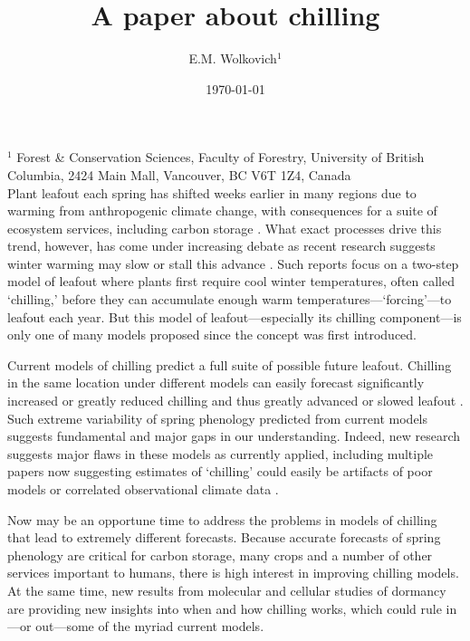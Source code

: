 \documentclass[11pt]{article}
\begin{document}
\renewcommand{\refname}{\CHead{}}


\title{A paper about chilling}
\author{E.M. Wolkovich$^1$} %
\date{\today}
\maketitle

$^1$ Forest \& Conservation Sciences, Faculty of Forestry, University of British Columbia, 2424 Main Mall, Vancouver, BC V6T 1Z4, Canada\\


Plant leafout each spring has shifted weeks earlier in many regions due to warming from anthropogenic climate change, with consequences for a suite of ecosystem services, including carbon storage \citep{keenan2014net,ipcc2022}.  What exact processes drive this trend, however, has come under increasing debate as recent research suggests winter warming may slow or stall this advance \citep{fu2015,piao2017}. Such reports focus on a two-step model of leafout where plants first require cool winter temperatures, often called `chilling,' before they can accumulate enough warm temperatures---`forcing'---to leafout each year. But this model of leafout---especially its chilling component---is only one of many models proposed \citep[at least 20 exist, see][]{hufkens2018integrated} since the concept was first introduced. 

Current models of chilling predict a full suite of possible future leafout. Chilling in the same location under different models can easily forecast significantly increased or greatly reduced chilling and thus greatly advanced or slowed leafout \citep{guy2014,chuine2016}. Such extreme variability of spring phenology predicted from current models suggests fundamental and major gaps in our understanding. Indeed, new research suggests major flaws in these models as currently applied, including multiple papers now suggesting estimates of `chilling' could easily be artifacts of poor models or correlated observational climate data \citep{decsens,gao2024}. 

Now may be an opportune time to address the problems in models of chilling that lead to extremely different forecasts. Because accurate forecasts of spring phenology are critical for carbon storage, many crops and a number of other services important to humans, there is high interest in improving chilling models. At the same time, new results from molecular and cellular studies of dormancy are providing new insights into when and how chilling works, which could rule in---or out---some of the myriad current models. 
\end{document}
